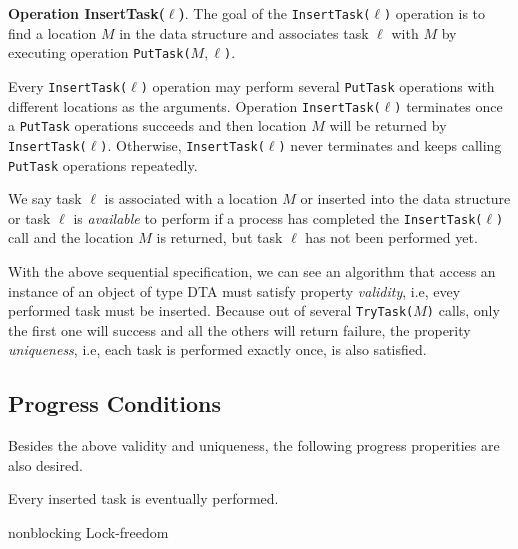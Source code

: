 \textbf{Operation InsertTask($\ell$)}.
The goal of the \texttt{InsertTask(}$\ell$\texttt{)} operation is to find a location $M$ in the data structure and
associates task $\ell$ with $M$ by executing operation \texttt{PutTask(}$M,\ell$\texttt{)}.

Every \texttt{InsertTask(}$\ell$\texttt{)} operation may perform several \texttt{PutTask} operations with
different locations as the arguments. Operation \texttt{InsertTask(}$\ell$\texttt{)} terminates once a
\texttt{PutTask} operations succeeds and then location $M$ will be returned by \texttt{InsertTask(}$\ell$\texttt{)}.
Otherwise, \texttt{InsertTask(}$\ell$\texttt{)} never terminates and keeps
calling \texttt{PutTask} operations repeatedly.

We say task $\ell$ is associated with a location $M$ or inserted into the data structure or task $\ell$
is \emph{available} to perform if a process has completed the \texttt{InsertTask(}$\ell$\texttt{)} call and the location
$M$ is returned, but task $\ell$ has not been performed yet.

With the above sequential specification, we can see an algorithm that access an instance of an object of type DTA
must satisfy property \emph{validity}, i.e, evey performed task must be inserted. Because out of several
\texttt{TryTask(}$M$\texttt{)} calls, only the first one will success and all the others will return failure, the properity
\emph{uniqueness}, i.e, each task is performed exactly once, is also satisfied.

\subsection{Progress Conditions}

Besides the above validity and uniqueness, the following progress properities are also desired.

\begin{condition}
Every inserted task is eventually performed.
\end{condition}

\begin{condition}
nonblocking Lock-freedom
\end{condition}


%
%
%

